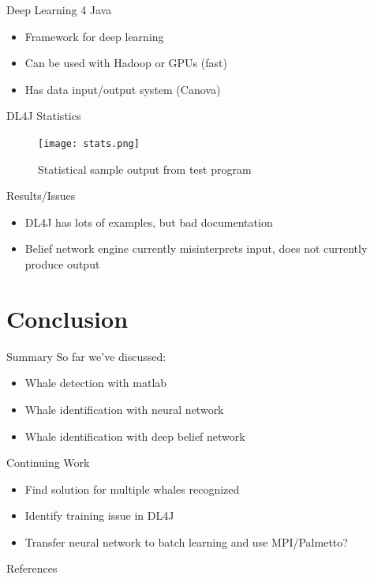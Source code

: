 \documentclass{beamer}
\begin{document}
\begin{frame}{Deep Learning 4 Java}
\begin{itemize}
\item Framework for deep learning
\item Can be used with Hadoop or GPUs (fast)
\item Has data input/output system (Canova)
\end{itemize}
\end{frame}

\begin{frame}{DL4J Statistics}
\begin{figure}
\texttt{[image: stats.png]}
\caption{Statistical sample output from test program}
\end{figure}
\end{frame}


\begin{frame}{Results/Issues}
\begin{itemize}
\item DL4J has lots of examples, but bad documentation
\item Belief network engine currently misinterprets input, does not currently
produce output
\end{itemize}
\end{frame}

\section{Conclusion}
\begin{frame}{Summary}
So far we've discussed:
\begin{itemize}
\item Whale detection with matlab
\item Whale identification with neural network
\item Whale identification with deep belief network
\end{itemize}
\end{frame}

\begin{frame}{Continuing Work}
\begin{itemize}
\item Find solution for multiple whales recognized
\item Identify training issue in DL4J
\item Transfer neural network to batch learning and use MPI/Palmetto?
\end{itemize}
\end{frame}

\begin{frame}{References}

\nocite{*}
\end{frame}
\end{document}
